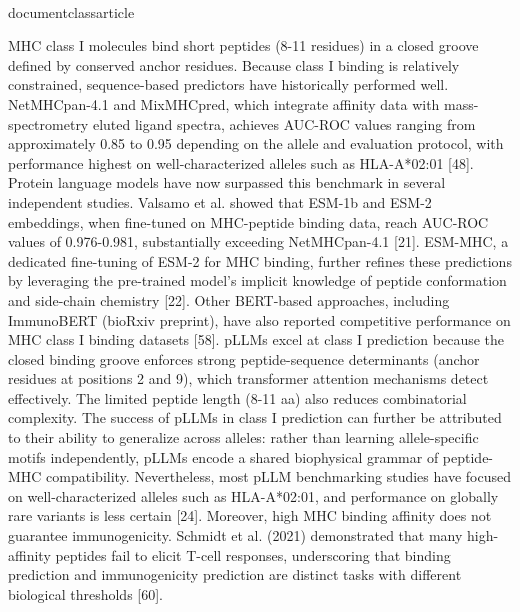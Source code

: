 \\documentclass{article}
\begin{document}
MHC class I molecules bind short peptides (8-11 residues) in a closed groove defined by conserved anchor residues. Because class I binding is relatively constrained, sequence-based predictors have historically performed well. NetMHCpan-4.1 and MixMHCpred, which integrate affinity data with mass-spectrometry eluted ligand spectra, achieves AUC-ROC values ranging from approximately 0.85 to 0.95 depending on the allele and evaluation protocol, with performance highest on well-characterized alleles such as HLA-A*02:01 [48]. Protein language models have now surpassed this benchmark in several independent studies. Valsamo et al. showed that ESM-1b and ESM-2 embeddings, when fine-tuned on MHC-peptide binding data, reach AUC-ROC values of 0.976-0.981, substantially exceeding NetMHCpan-4.1 [21]. ESM-MHC, a dedicated fine-tuning of ESM-2 for MHC binding, further refines these predictions by leveraging the pre-trained model's implicit knowledge of peptide conformation and side-chain chemistry [22]. Other BERT-based approaches, including ImmunoBERT (bioRxiv preprint), have also reported competitive performance on MHC class I binding datasets [58]. pLLMs excel at class I prediction because the closed binding groove enforces strong peptide-sequence determinants (anchor residues at positions 2 and 9), which transformer attention mechanisms detect effectively. The limited peptide length (8-11 aa) also reduces combinatorial complexity. The success of pLLMs in class I prediction can further be attributed to their ability to generalize across alleles: rather than learning allele-specific motifs independently, pLLMs encode a shared biophysical grammar of peptide-MHC compatibility. Nevertheless, most pLLM benchmarking studies have focused on well-characterized alleles such as HLA-A*02:01, and performance on globally rare variants is less certain [24]. Moreover, high MHC binding affinity does not guarantee immunogenicity. Schmidt et al. (2021) demonstrated that many high-affinity peptides fail to elicit T-cell responses, underscoring that binding prediction and immunogenicity prediction are distinct tasks with different biological thresholds [60].

\subsection{}
\end{document}
